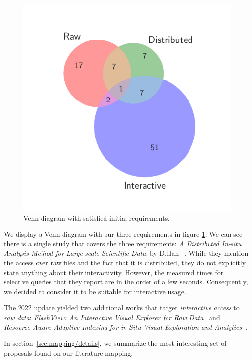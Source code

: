 \begin{figure}[htbp]
    \centering
    \includegraphics{images/3_mapping/venn}
    \caption{Venn diagram with satisfied initial requirements.}
    \label{fig:mapping/venn_requirements}
\end{figure}

We display a Venn diagram with our three requirements in figure \ref{fig:mapping/venn_requirements}. We can see there is a single study that covers the three requirements:
\textit{{A} {D}istributed {I}n-situ {A}nalysis {M}ethod for {L}arge-scale
{S}cientific {D}ata}, by D.Han \etal~\cite{Han2017}. While they mention the
access over raw files and the fact that it is distributed, they do not
explicitly state anything about their interactivity. However, the measured times
for selective queries that they report are in the order of a few seconds. Consequently, we
decided to consider it to be suitable for interactive usage.

The 2022 update yielded two additional works that target \emph{interactive access}
to \emph{raw data}: \textit{{FlashView}: {A}n {I}nteractive {V}isual {E}xplorer
for {R}aw {D}ata}~\cite{pang_flashview_2017} and
\textit{{R}esource-{A}ware {A}daptive {I}ndexing for in {S}itu {V}isual {E}xploration
and {A}nalytics}~\cite{maroulis_resourceaware_2023}.


In section~\ref{sec:mapping/details}, we summarize the most interesting set of
proposals found on our literature mapping.

